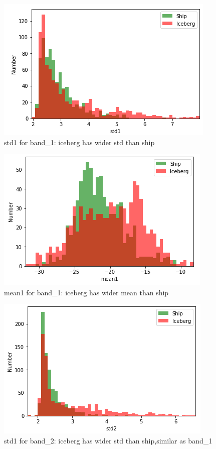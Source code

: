 \documentclass[fleqn,10pt]{SelfArx} %
\begin{document}
\begin{figure}[ht]\centering
\includegraphics[width=\linewidth]{std1}
\caption{std1 for band\_1: iceberg has wider std than ship}
\label{fig:std1}
\end{figure}
\begin{figure}[ht]\centering
\includegraphics[width=\linewidth]{mean1}
\caption{mean1 for band\_1: iceberg has wider mean than ship}
\label{fig:mean1}
\end{figure}
\begin{figure}[ht]\centering
\includegraphics[width=\linewidth]{std2}
\caption{std1 for band\_2: iceberg has wider std than ship,similar as band\_1}
\label{fig:std2}
\end{figure}
\end{document}
